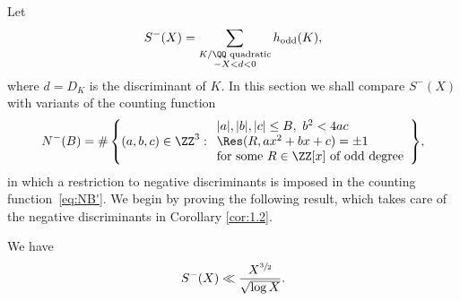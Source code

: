Let
\[
S^-(X)=
\sum_{
\substack{K/\QQ \text{ quadratic}\\
-X<d<0
}} h_\text{odd}(K),
\]
where $d=D_K$ is the discriminant of $K$.
In this section we shall compare
$S^-(X)$ with variants of the counting function
\begin{equation}\label{eq:NB-}
N^-(B)=\#\left\{(a,b,c)\in \ZZ^3:
\begin{array}{l}
|a|,|b|,|c|\leq B, ~b^2<4ac\\
\Res(R,ax^2+bx+c)=\pm 1\\
\text{for some $R\in \ZZ[x]$ of odd degree}
\end{array}
\right\}\!,
\end{equation}
in which a restriction to negative discriminants is imposed in the counting function~\eqref{eq:NB'}.
We begin by proving the following result, which takes care of the negative discriminants in Corollary
\ref{cor:1.2}.

\begin{lemma}\label{lem:plant}
We have
\[
S^-(X)\ll \frac{X^{\sfrac{3}{2}}}{\sqrt{\log X}}.
\]
\end{lemma}

